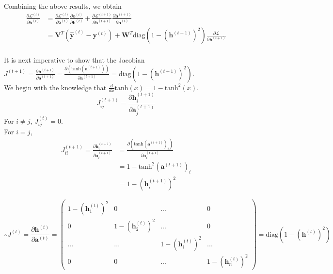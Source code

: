\documentclass{article}
\numberwithin{equation}{section}
\begin{document}
Combining the above results, we obtain
\begin{equation}
\label{eqn:backward-ht}
\begin{split}
	\frac{\partial \mathcal{L}^{(t)}}{\partial \bm{h}^{(t)}}
		&= \frac{\partial \mathcal{L}^{(t)}}{\partial \bm{o}^{(t)}} \frac{\partial \bm{o}^{(t)}}{\partial \bm{h}^{(t)}}
			+ \frac{\partial \mathcal{L}^{(t+1)}}{\partial \bm{h}^{(t+1)}} \frac{\partial \bm{h}^{(t+1)}}{\partial \bm{h}^{(t)}} \\
		&= \bm{V}^T(\hat{\bm{y}}^{(t)} - \bm{y}^{(t)}) + \bm{W}^T \text{diag}(1 - (\bm{h}^{(t+1)})^2) \frac{\partial \mathcal{L}}{\partial \bm{h}^{(t+1)}}
\end{split}
\end{equation}\\

It is next imperative to show that the Jacobian $J^{(t+1)} = \frac{\partial \bm{h}^{(t+1)}}{\partial \bm{a}^{(t+1)}} = \frac{\partial( \text{tanh}(\bm{a}^{(t+1)}))}{\partial \bm{a}^{(t+1)}} = \text{diag}(1 - (\bm{h}^{(t+1)})^2)$. \\

We begin with the knowledge that $\frac{d}{dx}\text{tanh}(x) = 1 - \text{tanh}^2(x)$.
	$$ J^{(t+1)}_{ij} = \frac{\partial \bm{h}^{(t+1)}_i}{\partial \bm{a}^{(t+1)}_j} $$
For $i \ne j$, $J^{(t)}_{ij} = 0$. \\
For $i = j$,
\begin{equation*}
\begin{split}
	J^{(t+1)}_{ii} = \frac{\partial \bm{h}^{(t+1)}_i}{\partial \bm{a}^{(t+1)}_i}
		&= \frac{\partial( \text{tanh}(\bm{a}^{(t+1)})_i)}{\partial \bm{a}^{(t+1)}_i} \\
		&= 1 - \text{tanh}^2 (\bm{a}^{(t+1)})_i \\
		&= 1 - (\bm{h}^{(t+1)}_i)^2
\end{split}
\end{equation*}

	$$ \therefore J^{(t)} = \frac{\partial \bm{h}^{(t)}}{\partial \bm{a}^{(t)}} =
		\begin{pmatrix}
		1 - (\bm{h}_1^{(t)})^2 & 0 & ... & 0 \\
		0 & 1 - (\bm{h}_2^{(t)})^2 & ... & 0 \\
		... & ... & 1 - (\bm{h}_i^{(t)})^2 & ... \\
		0 & 0 & ... & 1 - (\bm{h}_n^{(t)})^2
		\end{pmatrix}
		= \text{diag}(1 - (\bm{h}^{(t)})^2) $$\\
\end{document}
